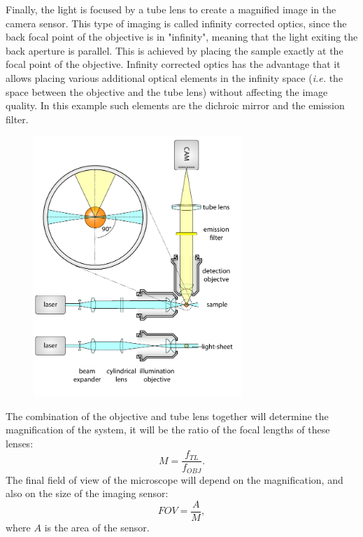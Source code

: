     Finally, the light is focused by a tube lens to create a magnified image in the camera sensor. This type of imaging is called infinity corrected optics, since the back focal point of the objective is in "infinity", meaning that the light exiting the back aperture is parallel. This is achieved by placing the sample exactly at the focal point of the objective. Infinity corrected optics has the advantage that it allows placing various additional optical elements in the infinity space (\textit{i.e.} the space between the objective and the tube lens) without affecting the image quality. In this example such elements are the dichroic mirror and the emission filter. 

    \begin{figure}[tb]
      \centering
      \includegraphics[page=4,width=0.7\textwidth]{spim_cyl}
      \label{fig:wide-field}
    \end{figure}


    The combination of the objective and tube lens together will determine the magnification of the system, it will be the ratio of the focal lengths of these lenses:
    \begin{equation}
      M = \frac{f_{TL}}{f_{OBJ}}.
      \label{eq:magnification}
    \end{equation}
    The final field of view of the microscope will depend on the magnification, and also on the size of the imaging sensor:
    \begin{equation}
      FOV = \frac{A}{M},
      \label{eq:FOV}
    \end{equation}
    where $A$ is the area of the sensor. 

